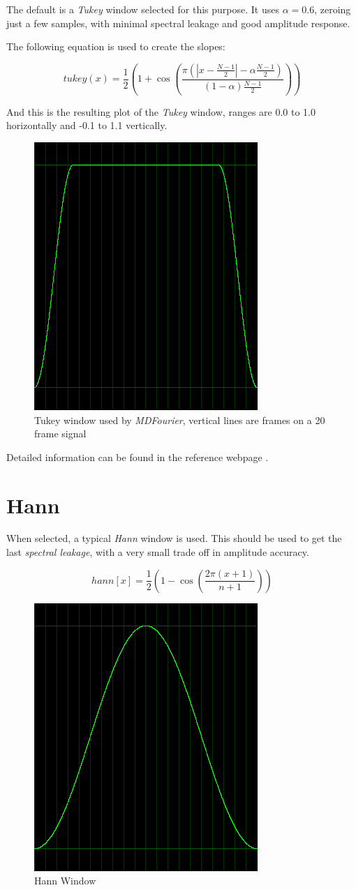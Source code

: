 \documentclass[10pt,a4paper]{report}
\begin{document}
\begin{appendices}
The default is a \textit{Tukey} window selected for this purpose. It uses $\alpha = 0.6$, zeroing just a few samples, with minimal spectral leakage and good amplitude response.

The following equation is used to create the slopes:

\begin{equation}
tukey(x)=\frac{1}{2}(1+\cos(\frac{\pi(|x-\frac{N-1}{2}|-\alpha \frac{N-1}{2})}{(1-\alpha)\frac{N-1}{2}}))
\end{equation}

And this is the resulting plot of the \textit{Tukey} window, ranges are 0.0 to 1.0 horizontally and -0.1 to 1.1 vertically.

\begin{figure}[H]
	\centering
	\includegraphics[width=0.4\linewidth]{plots/window-tukey.png}
	\caption[Tukey Window]{Tukey window used by \textit{MDFourier}, vertical lines are frames on a 20 frame signal}
	\label{fig:window-tukey}
\end{figure}

Detailed information can be found in the reference webpage \cite{tukey}.

\newpage
\section{Hann}
When selected, a typical \textit{Hann} window is used. This should be used to get the last \textit{spectral leakage}, with a very small trade off in amplitude accuracy.

\begin{equation}
hann[x] = \frac{1}{2}(1 - \cos(\frac{2\pi(x+1)}{n+1}))
\end{equation}

\begin{figure}[H]
	\centering
	\includegraphics[width=0.4\linewidth]{plots/window-hann.png}
	\caption[Hann Window]{Hann Window}
	\label{fig:window-hann}
\end{figure}


\end{appendices}
\end{document}

